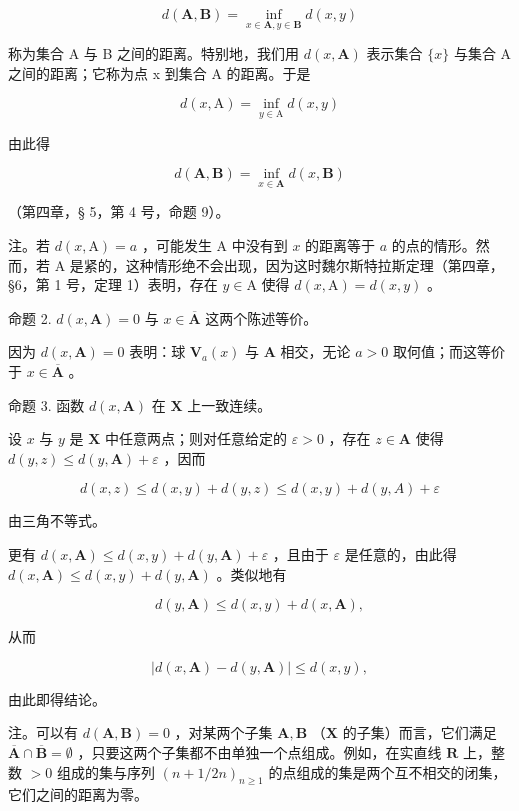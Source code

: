 \[
d (\mathbf {A}, \mathbf {B}) = \inf _ {x \in \mathbf {A}, y \in \mathbf {B}} d (x, y)
\]

称为集合 A 与 B 之间的距离。特别地，我们用 \(d(x, \mathbf{A})\) 表示集合 \(\{x\}\) 与集合 A 之间的距离；它称为点 x 到集合 A 的距离。于是

\[
d (x, \mathrm{A}) = \inf _ {y \in \mathrm{A}} d (x, y)
\]

由此得

\[
d (\mathbf {A}, \mathbf {B}) = \inf _ {x \in \mathbf {A}} d (x, \mathbf {B})
\]

（第四章，§ 5，第 4 号，命题 9）。

注。若 \(d(x, \mathrm{A}) = a\) ，可能发生 A 中没有到 \(x\) 的距离等于 \(a\) 的点的情形。然而，若 A 是紧的，这种情形绝不会出现，因为这时魏尔斯特拉斯定理（第四章，§6，第 1 号，定理 1）表明，存在 \(y \in \mathrm{A}\) 使得 \(d(x, \mathrm{A}) = d(x, y)\) 。

命题 2. \(d(x, \mathbf{A}) = 0\) 与 \(x \in \overline{\mathbf{A}}\) 这两个陈述等价。

因为 \(d(x, \mathbf{A}) = 0\) 表明：球 \(\mathbf{V}_a(x)\) 与 \(\mathbf{A}\) 相交，无论 \(a > 0\) 取何值；而这等价于 \(x \in \overline{\mathbf{A}}\) 。

命题 3. 函数 \(d(x, \mathbf{A})\) 在 \(\mathbf{X}\) 上一致连续。

设 \(x\) 与 \(y\) 是 \(\mathbf{X}\) 中任意两点；则对任意给定的 \(\varepsilon > 0\) ，存在 \(z \in \mathbf{A}\) 使得 \(d(y, z) \leqslant d(y, \mathbf{A}) + \varepsilon\) ，因而

\[
d (x, z) \leqslant d (x, y) + d (y, z) \leqslant d (x, y) + d (y, A) + \varepsilon
\]

由三角不等式。

更有 \(d(x, \mathbf{A}) \leqslant d(x, y) + d(y, \mathbf{A}) + \varepsilon\) ，且由于 \(\varepsilon\) 是任意的，由此得 \(d(x, \mathbf{A}) \leqslant d(x, y) + d(y, \mathbf{A})\) 。类似地有

\[
d (y, \mathbf {A}) \leqslant d (x, y) + d (x, \mathbf {A}),
\]

从而

\[
\left| d (x, \mathbf {A}) - d (y, \mathbf {A}) \right| \leqslant d (x, y),\tag{2}
\]

由此即得结论。

注。可以有 \(d(\mathbf{A}, \mathbf{B}) = 0\) ，对某两个子集 \(\mathbf{A}, \mathbf{B}\) （\(\mathbf{X}\) 的子集）而言，它们满足 \(\overline{\mathbf{A}} \cap \overline{\mathbf{B}} = \emptyset\) ，只要这两个子集都不由单独一个点组成。例如，在实直线 \(\mathbf{R}\) 上，整数 \(> 0\) 组成的集与序列 \((n + 1/2n)_{n \geqslant 1}\) 的点组成的集是两个互不相交的闭集，它们之间的距离为零。

